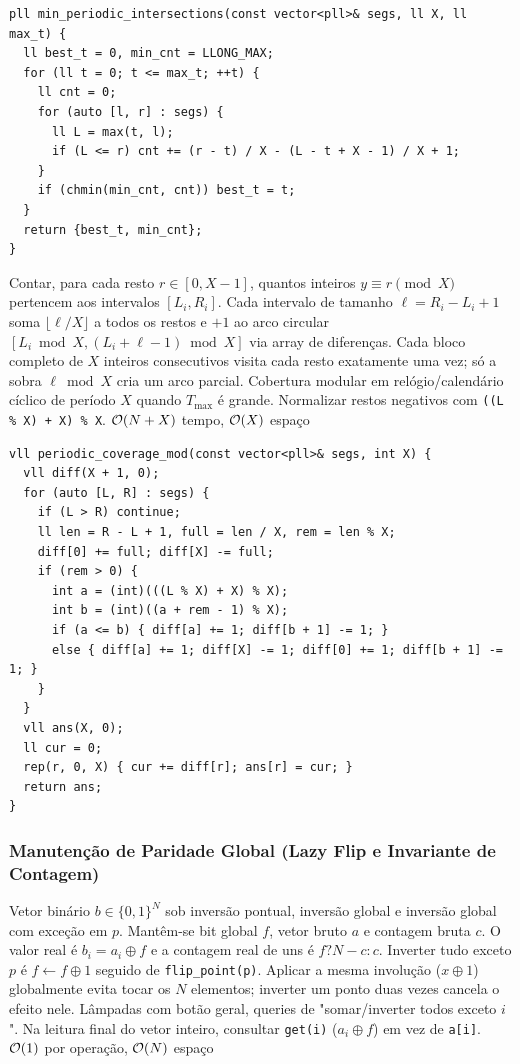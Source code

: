 \begin{lstlisting}
pll min_periodic_intersections(const vector<pll>& segs, ll X, ll max_t) {
  ll best_t = 0, min_cnt = LLONG_MAX;
  for (ll t = 0; t <= max_t; ++t) {
    ll cnt = 0;
    for (auto [l, r] : segs) {
      ll L = max(t, l);
      if (L <= r) cnt += (r - t) / X - (L - t + X - 1) / X + 1;
    }
    if (chmin(min_cnt, cnt)) best_t = t;
  }
  return {best_t, min_cnt};
}
\end{lstlisting}

\algobox
  {Contar, para cada resto $r \in [0, X-1]$, quantos inteiros $y \equiv r \pmod X$ pertencem aos intervalos $[L_i, R_i]$.}
  {Cada intervalo de tamanho $\ell = R_i - L_i + 1$ soma $\lfloor \ell / X \rfloor$ a todos os restos e $+1$ ao arco circular $[L_i \bmod X, (L_i + \ell - 1) \bmod X]$ via array de diferenças.}
  {Cada bloco completo de $X$ inteiros consecutivos visita cada resto exatamente uma vez; só a sobra $\ell \bmod X$ cria um arco parcial.}
  {Cobertura modular em relógio/calendário cíclico de período $X$ quando $T_{\max}$ é grande.}
  {Normalizar restos negativos com \texttt{((L \% X) + X) \% X}.}
  {$\mathcal{O}(N + X)$ tempo, $\mathcal{O}(X)$ espaço}

\begin{lstlisting}
vll periodic_coverage_mod(const vector<pll>& segs, int X) {
  vll diff(X + 1, 0);
  for (auto [L, R] : segs) {
    if (L > R) continue;
    ll len = R - L + 1, full = len / X, rem = len % X;
    diff[0] += full; diff[X] -= full;
    if (rem > 0) {
      int a = (int)(((L % X) + X) % X);
      int b = (int)((a + rem - 1) % X);
      if (a <= b) { diff[a] += 1; diff[b + 1] -= 1; }
      else { diff[a] += 1; diff[X] -= 1; diff[0] += 1; diff[b + 1] -= 1; }
    }
  }
  vll ans(X, 0);
  ll cur = 0;
  rep(r, 0, X) { cur += diff[r]; ans[r] = cur; }
  return ans;
}
\end{lstlisting}

\subsubsection{Manutenção de Paridade Global (Lazy Flip e Invariante de Contagem)}
\algobox
  {Vetor binário $b \in \{0, 1\}^N$ sob inversão pontual, inversão global e inversão global com exceção em $p$.}
  {Mantêm-se bit global $f$, vetor bruto $a$ e contagem bruta $c$. O valor real é $b_i = a_i \oplus f$ e a contagem real de uns é $f ? N - c : c$. Inverter tudo exceto $p$ é $f \leftarrow f \oplus 1$ seguido de \texttt{flip\_point(p)}.}
  {Aplicar a mesma involução ($x \oplus 1$) globalmente evita tocar os $N$ elementos; inverter um ponto duas vezes cancela o efeito nele.}
  {Lâmpadas com botão geral, queries de "somar/inverter todos exceto $i$".}
  {Na leitura final do vetor inteiro, consultar \texttt{get(i)} ($a_i \oplus f$) em vez de \texttt{a[i]}.}
  {$\mathcal{O}(1)$ por operação, $\mathcal{O}(N)$ espaço}

